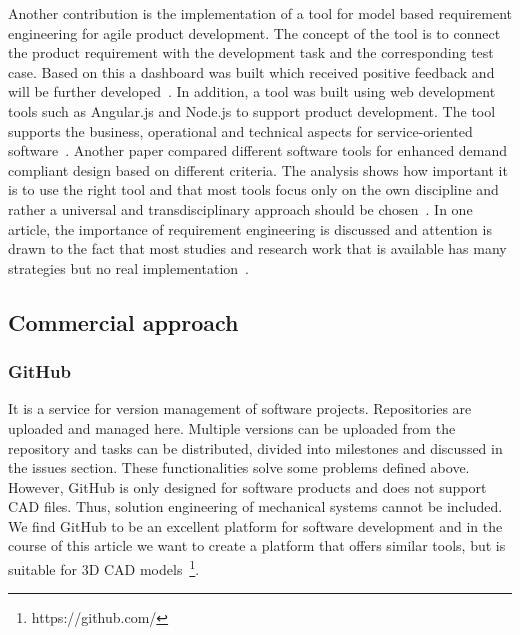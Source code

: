     Another contribution is the implementation of a tool for model based requirement engineering for agile product development. The concept of the tool is to connect the product requirement with the development task and the corresponding test case. Based on this a dashboard was built which received positive feedback and will be further developed~\cite{WINDISCH2022550}.
    In addition, a tool was built using web development tools such as Angular.js and Node.js to support product development. The tool supports the business, operational and technical aspects for service-oriented software~\cite{belfadel2022requirements}.
    Another paper compared different software tools for enhanced demand compliant design based on different criteria. The analysis shows how important it is to use the right tool and that most tools focus only on the own discipline and rather a universal and transdisciplinary approach should be chosen~\cite{9447081}.
    In one article, the importance of requirement engineering is discussed and attention is drawn to the fact that most studies and research work that is available has many strategies but no real implementation~\cite{kumar2022requirements}.

    \subsection*{Commercial approach}
    \subsubsection*{GitHub}
    It is a service for version management of software projects. Repositories are uploaded and managed here. Multiple versions can be uploaded from the repository and tasks can be distributed, divided into milestones and discussed in the issues section. These functionalities solve some problems defined above. However, GitHub is only designed for software products and does not support CAD files. Thus, solution engineering of mechanical systems cannot be included. We find GitHub to be an excellent platform for software development and in the course of this article we want to create a platform that offers similar tools, but is suitable for 3D CAD models~\footnote{https://github.com/}.

